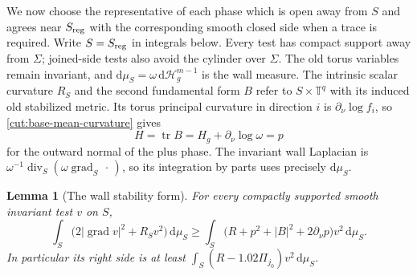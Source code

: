 \documentclass[11pt]{article}
\numberwithin{equation}{section}
\newtheorem{lemma}[theorem]{Lemma}
\theoremstyle{definition}
\theoremstyle{remark}
\begin{document}
We now choose the representative of each phase which is open away from
$S$ and agrees near $S_{\rm reg}$ with the corresponding smooth closed
side when a trace is required.  Write $S=S_{\rm reg}$ in integrals below.
Every test has compact support away from $\Sigma$; joined-side tests
also avoid the cylinder over $\Sigma$.  The old torus variables remain
invariant, and $\mathrm d\mu_S=\omega\,\mathrm d\mathcal H_g^{m-1}$ is the wall
measure.  The intrinsic scalar curvature $R_S$ and the second
fundamental form $B$ refer to $S\times\mathbb T^q$ with its induced old
stabilized metric.  Its torus principal curvature in direction $i$ is
$\partial_\nu\log f_i$, so \eqref{cut:base-mean-curvature} gives
\[
          H=\operatorname{tr} B=H_g+\partial_\nu\log\omega=p
\]
for the outward normal of the plus phase.  The invariant wall Laplacian
is $\omega^{-1}\operatorname{div}_S(\omega\operatorname{grad}_S\,\cdot\,)$, so its integration by
parts uses precisely $\mathrm d\mu_S$.

\begin{lemma}[The wall stability form]\label{cut:wall-stability}
For every compactly supported smooth invariant test $v$ on $S$,
\begin{equation}\label{cut:wall-form}
 \int_S\bigl(2|\operatorname{grad} v|^2+R_Sv^2\bigr)\,\mathrm d\mu_S
 \ge\int_S\bigl(R+p^2+|B|^2+2\partial_\nu p\bigr)v^2\,\mathrm d\mu_S.
\end{equation}
In particular its right side is at least
$\int_S(R-1.02\Pi_{j_0})v^2\,\mathrm d\mu_S$.
\end{lemma}
\end{document}
